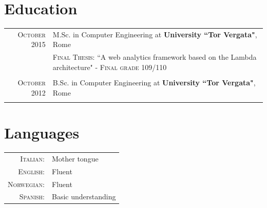 \documentclass[a4paper,10pt]{article} %
\begin{document}
\section{Education}

\begin{tabular}{r|p{11cm}}	

\textsc{October} 2015 & M.Sc. in Computer Engineering at \textbf{University ``Tor Vergata"}, Rome\\
& \textsc{Final Thesis}: ``A web analytics framework based on the Lambda architecture" - \textsc{Final grade} 109/110\\
\multicolumn{2}{c}{} \\





\textsc{October} 2012 & B.Sc. in Computer Engineering at \textbf{University ``Tor Vergata"}, Rome\\
\multicolumn{2}{c}{} \\



\end{tabular}


\section{Languages}

\begin{tabular}{rl}

\textsc{Italian:} & Mother tongue\\

\textsc{English:} & Fluent\\

\textsc{Norwegian:} & Fluent\\

\textsc{Spanish:} & Basic understanding\\

\end{tabular}
\end{document}
